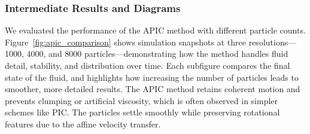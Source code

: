\subsubsection{Intermediate Results and Diagrams}
We evaluated the performance of the APIC method with different particle counts. Figure~\ref{fig:apic_comparison} shows simulation snapshots at three resolutions—1000, 4000, and 8000 particles—demonstrating how the method handles fluid detail, stability, and distribution over time. Each subfigure compares the final state of the fluid, and highlights how increasing the number of particles leads to smoother, more detailed results.
The APIC method retains coherent motion and prevents clumping or artificial viscosity, which is often observed in simpler schemes like PIC. The particles settle smoothly while preserving rotational features due to the affine velocity transfer.
